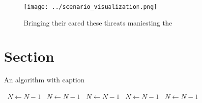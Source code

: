 \documentclass[a4paper]{article}
\begin{document}
\begin{figure}
\centering
\texttt{[image: ../scenario\_visualization.png]}
\caption{Bringing their eared these threats maniesting the
}
\end{figure}
 
\section{Section}

\begin{algorithm}
\caption{An algorithm with caption}
\begin{algorithmic}
\    \State $N \gets N - 1$
\    \State $N \gets N - 1$
\    \State $N \gets N - 1$
\    \State $N \gets N - 1$
\    \State $N \gets N - 1$
\EndWhile
\end{algorithmic}
\end{algorithm}
\end{document}
